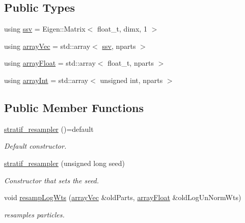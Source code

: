 \subsection*{Public Types}
\begin{DoxyCompactItemize}
\item 
using \hyperlink{classstratif__resampler_a9b8a1de85ef718528f4c889678a9331f}{ssv} = Eigen\+::\+Matrix$<$ float\+\_\+t, dimx, 1 $>$
\item 
using \hyperlink{classstratif__resampler_aafc4c3078fcc2912b41ad76465d86491}{array\+Vec} = std\+::array$<$ \hyperlink{classrbase_ae20e0b8df15aa109252f57ecbf1f20f8}{ssv}, nparts $>$
\item 
using \hyperlink{classstratif__resampler_ad85a57b7463ac619bb3123a2cd20bb01}{array\+Float} = std\+::array$<$ float\+\_\+t, nparts $>$
\item 
using \hyperlink{classstratif__resampler_a6feed5616bbd45f1bcf155fdf6348e19}{array\+Int} = std\+::array$<$ unsigned int, nparts $>$
\end{DoxyCompactItemize}
\subsection*{Public Member Functions}
\begin{DoxyCompactItemize}
\item 
\mbox{\label{classstratif__resampler_a76e8fbfaec214060f0644d5a076c2b2a}} 
\hyperlink{classstratif__resampler_a76e8fbfaec214060f0644d5a076c2b2a}{stratif\+\_\+resampler} ()=default
\begin{DoxyCompactList}\small\item\em Default constructor. \end{DoxyCompactList}\item 
\hyperlink{classstratif__resampler_acb18d2ea4d0c2025c2bdb58c3b6ddf4b}{stratif\+\_\+resampler} (unsigned long seed)
\begin{DoxyCompactList}\small\item\em Constructor that sets the seed. \end{DoxyCompactList}\item 
void \hyperlink{classstratif__resampler_a2588147563bf3fe598e262cae7e125e6}{resamp\+Log\+Wts} (\hyperlink{classrbase_aa12fc826befa6ba0647b5f59ebc396ee}{array\+Vec} \&old\+Parts, \hyperlink{classrbase_a6f76bef853e508cb5b6f546d231b06f5}{array\+Float} \&old\+Log\+Un\+Norm\+Wts)
\begin{DoxyCompactList}\small\item\em resamples particles. \end{DoxyCompactList}\end{DoxyCompactItemize}
